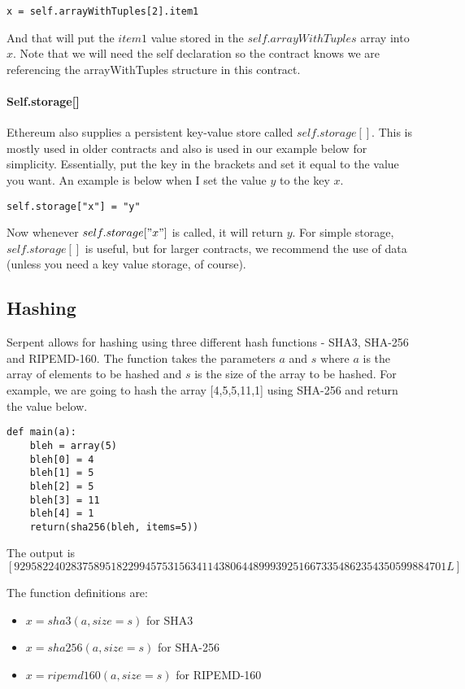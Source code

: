 \documentclass[12pt]{article}
\begin{document}
\begin{verbatim}
x = self.arrayWithTuples[2].item1
\end{verbatim}

And that will put the $item1$ value stored in the $self.arrayWithTuples$ array into $x$. \cite{Serpent} Note that we will need the self declaration so the contract knows we are referencing the arrayWithTuples structure in this contract.

\paragraph{Self.storage[]}
Ethereum also supplies a persistent key-value store called $self.storage[]$. This is mostly used in older contracts and also is used in our example below for simplicity. Essentially, put the key in the brackets and set it equal to the value you want. An example is below when I set the value $y$ to the key $x$.

\begin{verbatim}
self.storage["x"] = "y"
\end{verbatim}

Now whenever $self.storage["x"]$ is called, it will return $y$. For simple storage, $self.storage[]$ is useful, but for larger contracts, we recommend the use of data (unless you need a key value storage, of course). \cite{Serpent, Serpent1.0(old)}

\subsection{Hashing}
Serpent allows for hashing using three different hash functions - SHA3, SHA-256 and RIPEMD-160. The function takes the parameters $a$ and $s$ where $a$ is the array of elements to be hashed and $s$ is the size of the array to be hashed. For example, we are going to hash the array [4,5,5,11,1] using SHA-256 and return the value below. \cite{Serpent}

\begin{verbatim}
def main(a):
	bleh = array(5)
	bleh[0] = 4
	bleh[1] = 5
	bleh[2] = 5
	bleh[3] = 11
	bleh[4] = 1
	return(sha256(bleh, items=5))
\end{verbatim}
The output is $[9295822402837589518229945753156341143806448999392516673354862354350599884701L]$

The function definitions are:
\begin{itemize}
	\item $x = sha3(a, size=s)$ for SHA3
	\item $x = sha256(a, size=s)$ for SHA-256
	\item $x = ripemd160(a, size=s)$ for RIPEMD-160
\end{itemize}
\end{document}
